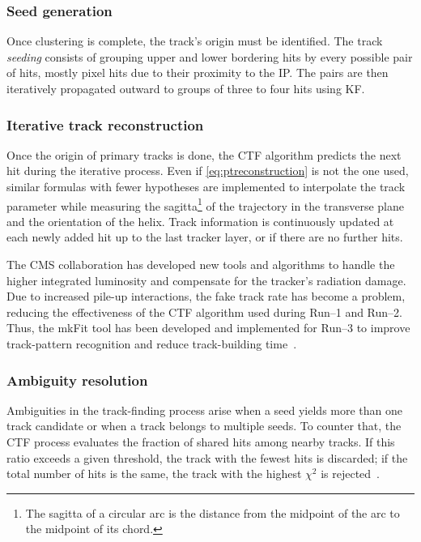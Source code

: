 \subsubsection{Seed generation}

Once clustering is complete, the track's origin must be identified. The track \textit{seeding} consists of grouping upper and lower bordering hits by every possible pair of hits, mostly pixel hits due to their proximity to the IP. The pairs are then iteratively propagated outward to groups of three to four hits using KF.

\subsubsection{Iterative track reconstruction}

Once the origin of primary tracks is done, the CTF algorithm predicts the next hit during the iterative process. Even if \cref{eq:ptreconstruction} is not the one used, similar formulas with fewer hypotheses are implemented to interpolate the track parameter while measuring the sagitta\footnote{The sagitta of a circular arc is the distance from the midpoint of the arc to the midpoint of its chord.} of the trajectory in the transverse plane and the orientation of the helix. Track information is continuously updated at each newly added hit up to the last tracker layer, or if there are no further hits.

The CMS collaboration has developed new tools and algorithms to handle the higher integrated luminosity and compensate for the tracker's radiation damage. Due to increased pile-up interactions, the fake track rate has become a problem, reducing the effectiveness of the CTF algorithm used during Run--1 and Run--2. Thus, the mkFit tool has been developed and implemented for Run--3 to improve track-pattern recognition and reduce track-building time~\cite{mkfit}.

\subsubsection{Ambiguity resolution}

Ambiguities in the track-finding process arise when a seed yields more than one track candidate or when a track belongs to multiple seeds. To counter that, the CTF process evaluates the fraction of shared hits among nearby tracks. If this ratio exceeds a given threshold, the track with the fewest hits is discarded; if the total number of hits is the same, the track with the highest $\chi^2$ is rejected~\cite{CTF_track_cms}.

